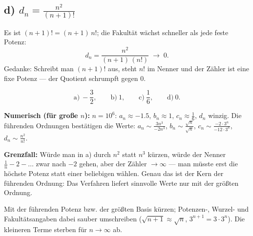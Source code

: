 \subsection*{d) $d_n=\frac{n^2}{(n+1)!}$}
Es ist $(n+1)!=(n+1)\,n!$; die Fakult\"at w\"achst schneller als jede
feste Potenz:
\begin{equation}
  d_n=\frac{n^2}{(n+1)\,(n!)}\;\to\;0 .
\end{equation}
Gedanke: Schreibt man $(n+1)!$ aus, steht $n!$ im Nenner und der Z\"ahler
ist eine fixe Potenz --- der Quotient schrumpft gegen $0$.

\begin{ergebnis}
\begin{equation*}
  \text{a)}\ -\frac32,\qquad
  \text{b)}\ 1,\qquad
  \text{c)}\ \frac16,\qquad
  \text{d)}\ 0 .
\end{equation*}
\end{ergebnis}

\begin{kontrolle}
\textbf{Numerisch (f\"ur gro\ss{}e $n$):} $n=10^6$: $a_n\approx-1.5$,
$b_n\approx1$, $c_n\approx\frac16$, $d_n$ winzig. Die f\"uhrenden
Ordnungen best\"atigen die Werte:
$a_n\sim\frac{3n^3}{-2n^3}$, $b_n\sim\frac{\sqrt n}{\sqrt n}$, $c_n\sim
\frac{-2\cdot3^n}{-12\cdot3^n}$, $d_n\sim\frac{n^2}{n!}$.

\textbf{Grenzfall:} W\"urde man in a) durch $n^2$ statt $n^3$ k\"urzen,
w\"urde der Nenner $\frac1n-2-\dots$ zwar nach $-2$ gehen, aber der
Z\"ahler $\to\infty$ --- man m\"usste erst die h\"ochste Potenz statt
einer beliebigen w\"ahlen. Genau das ist der Kern der f\"uhrenden
Ordnung: Das Verfahren liefert sinnvolle Werte nur mit der gr\"o\ss{}ten
Ordnung.
\end{kontrolle}

\begin{merksatz}
Mit der f\"uhrenden Potenz bzw. der gr\"o\ss{}ten Basis k\"urzen;
Potenzen-, Wurzel- und Fakult\"atsangaben dabei sauber umschreiben
($\sqrt{n+1}\approx\sqrt n$, $3^{n+1}=3\cdot3^n$). Die kleineren Terme
sterben f\"ur $n\to\infty$ ab.
\end{merksatz}

